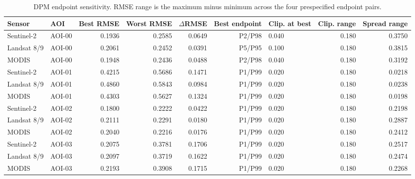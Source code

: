 \begin{table}[!t]\centering\scriptsize
\caption{DPM endpoint sensitivity. RMSE range is the maximum minus minimum across the four prespecified endpoint pairs.}
\label{tab:dpm-sensitivity}
\begin{tabular}{llrrrrlrr}
\toprule
Sensor & AOI & Best RMSE & Worst RMSE & $\Delta$RMSE & Best endpoint & Clip. at best & Clip. range & Spread range \\
\midrule
Sentinel-2 & AOI-00 & 0.1936 & 0.2585 & 0.0649 & P2/P98 & 0.040 & 0.180 & 0.3750 \\
Landsat 8/9 & AOI-00 & 0.2061 & 0.2452 & 0.0391 & P5/P95 & 0.100 & 0.180 & 0.3815 \\
MODIS & AOI-00 & 0.1948 & 0.2436 & 0.0488 & P2/P98 & 0.040 & 0.180 & 0.3192 \\
Sentinel-2 & AOI-01 & 0.4215 & 0.5686 & 0.1471 & P1/P99 & 0.020 & 0.180 & 0.0218 \\
Landsat 8/9 & AOI-01 & 0.4860 & 0.5843 & 0.0984 & P1/P99 & 0.020 & 0.180 & 0.0238 \\
MODIS & AOI-01 & 0.4303 & 0.5627 & 0.1324 & P1/P99 & 0.020 & 0.180 & 0.0198 \\
Sentinel-2 & AOI-02 & 0.1800 & 0.2222 & 0.0422 & P1/P99 & 0.020 & 0.180 & 0.2198 \\
Landsat 8/9 & AOI-02 & 0.2111 & 0.2291 & 0.0180 & P1/P99 & 0.020 & 0.180 & 0.2887 \\
MODIS & AOI-02 & 0.2040 & 0.2216 & 0.0176 & P1/P99 & 0.020 & 0.180 & 0.2412 \\
Sentinel-2 & AOI-03 & 0.2075 & 0.3781 & 0.1706 & P1/P99 & 0.020 & 0.180 & 0.2517 \\
Landsat 8/9 & AOI-03 & 0.2097 & 0.3719 & 0.1622 & P1/P99 & 0.020 & 0.180 & 0.2474 \\
MODIS & AOI-03 & 0.2193 & 0.3908 & 0.1715 & P1/P99 & 0.020 & 0.180 & 0.2268 \\
\bottomrule\end{tabular}\end{table}
